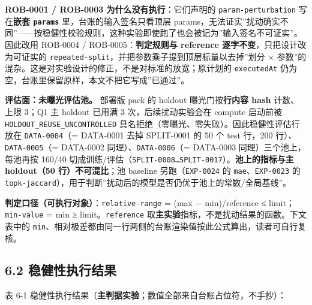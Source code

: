 \documentclass[
  11pt,
]{ctexart}
\begin{document}
\textbf{ROB-0001 / ROB-0003 为什么没有执行}：它们声明的
\texttt{param-perturbation} 写在\textbf{嵌套 \texttt{params}}
里，台账的输入签名只看顶层
params，无法证实''扰动确实不同''------按稳健性校验规则，这种实验即使跑了也会被记为''输入签名不可证实''。因此改用
ROB-0004 / ROB-0005：\textbf{判定规则与 reference
逐字不变}，只把设计改为可证实的
\texttt{repeated-split}，并把参数乘子提到顶层标量以去掉''划分 ×
参数''的混杂。这是对实验设计的修正，不是对标准的放宽；原计划的
\texttt{executedAt} 仍为空，台账里保留原样，本文不把它写成''已通过''。

\textbf{评估面：未曝光评估池。} 部署版 pack 的 holdout
曝光门按\textbf{行内容 hash} 计数、上限 3；Q1 主 holdout 已用满 3
次，后续扰动实验会在 compute 启动前被
\texttt{HOLDOUT\_\allowbreak{}REUSE\_\allowbreak{}UNCONTROLLED}
具名拒绝（零曝光、零失败）。因此稳健性评估行放在 \texttt{DATA-0004}（=
DATA-0001 去掉 SPLIT-0001 的 50 个 test 行，200
行）、\texttt{DATA-0005}（= DATA-0002 同理）、\texttt{DATA-0006}（=
DATA-0003 同理）三个池上，每池再按 160/40
切成训练/评估（\texttt{SPLIT-0008…SPLIT-0017}）。\textbf{池上的指标与主
holdout（50 行）不可混比}；池 baseline 另跑（\texttt{EXP-0024} 的
\texttt{mae}、\texttt{EXP-0023} 的
\texttt{topk-jaccard}），用于判断''扰动后的模型是否仍优于池上的常数/全局基线''。

\textbf{判定口径（可执行对象）}：\texttt{relative-range} = (max −
min)/\textbar reference\textbar{} ≤ limit；\texttt{min-value} = min ≥
limit。\texttt{reference}
取\textbf{主实验}指标，不是扰动结果的函数。下文表中的
\texttt{min}、相对极差都由同一行两侧的台账渲染值按此公式算出，读者可自行复核。

\subsection{6.2
稳健性执行结果}\label{ux7a33ux5065ux6027ux6267ux884cux7ed3ux679c}

表 6-1
稳健性执行结果（\textbf{主判据实验}；数值全部来自台账占位符，不手抄）：
\end{document}
